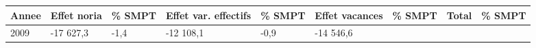 \begin{longtable}[]{@{}lllllllll@{}}
\toprule
\begin{minipage}[b]{0.05\columnwidth}\raggedright
Annee\strut
\end{minipage} & \begin{minipage}[b]{0.10\columnwidth}\raggedright
Effet noria\strut
\end{minipage} & \begin{minipage}[b]{0.06\columnwidth}\raggedright
\% SMPT\strut
\end{minipage} & \begin{minipage}[b]{0.16\columnwidth}\raggedright
Effet var. effectifs\strut
\end{minipage} & \begin{minipage}[b]{0.06\columnwidth}\raggedright
\% SMPT\strut
\end{minipage} & \begin{minipage}[b]{0.12\columnwidth}\raggedright
Effet vacances\strut
\end{minipage} & \begin{minipage}[b]{0.06\columnwidth}\raggedright
\% SMPT\strut
\end{minipage} & \begin{minipage}[b]{0.09\columnwidth}\raggedright
Total\strut
\end{minipage} & \begin{minipage}[b]{0.06\columnwidth}\raggedright
\% SMPT\strut
\end{minipage}\tabularnewline
\midrule
\endhead
\begin{minipage}[t]{0.05\columnwidth}\raggedright
2009\strut
\end{minipage} & \begin{minipage}[t]{0.10\columnwidth}\raggedright
-17 627,3\strut
\end{minipage} & \begin{minipage}[t]{0.06\columnwidth}\raggedright
-1,4\strut
\end{minipage} & \begin{minipage}[t]{0.16\columnwidth}\raggedright
-12 108,1\strut
\end{minipage} & \begin{minipage}[t]{0.06\columnwidth}\raggedright
-0,9\strut
\end{minipage} & \begin{minipage}[t]{0.12\columnwidth}\raggedright
-14 546,6\strut
\end{minipage} & \begin{minipage}[t]{0.06\columnwidth}\raggedright

\end{minipage}
\end{longtable}
